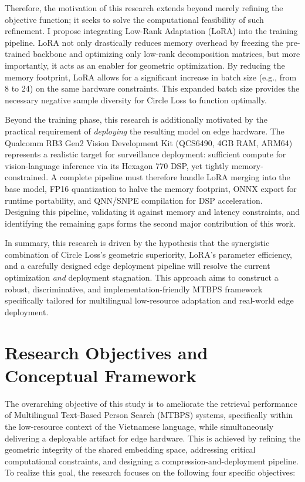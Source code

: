 \documentclass[../main.tex]{subfiles}
\begin{document}
\noindent Therefore, the motivation of this research extends beyond merely refining the objective function; it seeks to solve the computational feasibility of such refinement. I propose integrating Low-Rank Adaptation (LoRA) into the training pipeline. LoRA not only drastically reduces memory overhead by freezing the pre-trained backbone and optimizing only low-rank decomposition matrices, but more importantly, it acts as an enabler for geometric optimization. By reducing the memory footprint, LoRA allows for a significant increase in batch size (e.g., from 8 to 24) on the same hardware constraints. This expanded batch size provides the necessary negative sample diversity for Circle Loss to function optimally.

\noindent Beyond the training phase, this research is additionally motivated by the practical requirement of \textit{deploying} the resulting model on edge hardware. The Qualcomm RB3 Gen2 Vision Development Kit (QCS6490, 4GB RAM, ARM64) represents a realistic target for surveillance deployment: sufficient compute for vision-language inference via its Hexagon 770 DSP, yet tightly memory-constrained. A complete pipeline must therefore handle LoRA merging into the base model, FP16 quantization to halve the memory footprint, ONNX export for runtime portability, and QNN/SNPE compilation for DSP acceleration. Designing this pipeline, validating it against memory and latency constraints, and identifying the remaining gaps forms the second major contribution of this work.

\noindent In summary, this research is driven by the hypothesis that the synergistic combination of Circle Loss's geometric superiority, LoRA's parameter efficiency, and a carefully designed edge deployment pipeline will resolve the current optimization \textit{and} deployment stagnation. This approach aims to construct a robust, discriminative, and implementation-friendly MTBPS framework specifically tailored for multilingual low-resource adaptation and real-world edge deployment.

\section{Research Objectives and Conceptual Framework}
\label{sec:objectives}

The overarching objective of this study is to ameliorate the retrieval performance of Multilingual Text-Based Person Search (MTBPS) systems, specifically within the low-resource context of the Vietnamese language, while simultaneously delivering a deployable artifact for edge hardware. This is achieved by refining the geometric integrity of the shared embedding space, addressing critical computational constraints, and designing a compression-and-deployment pipeline. To realize this goal, the research focuses on the following four specific objectives:
\end{document}

